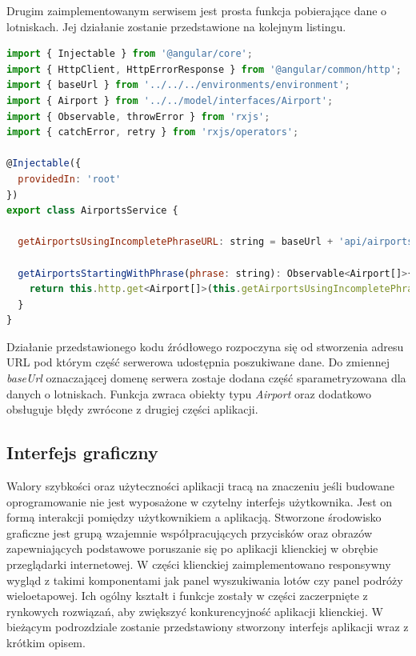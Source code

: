 \documentclass[12pt, twoside]{report}
\begin{document}
Drugim zaimplementowanym serwisem jest prosta funkcja pobierające dane o lotniskach. Jej działanie zostanie przedstawione na kolejnym listingu.
\begin{lstlisting}[language=JavaScript, caption= Kod źródłowy funkcji pobierającej wyniki z serwera]
import { Injectable } from '@angular/core';
import { HttpClient, HttpErrorResponse } from '@angular/common/http';
import { baseUrl } from '../../../environments/environment';
import { Airport } from '../../model/interfaces/Airport';
import { Observable, throwError } from 'rxjs';
import { catchError, retry } from 'rxjs/operators';

@Injectable({
  providedIn: 'root'
})
export class AirportsService {

  getAirportsUsingIncompletePhraseURL: string = baseUrl + 'api/airports/getAirportsStartingWith/';

  getAirportsStartingWithPhrase(phrase: string): Observable<Airport[]>{
    return this.http.get<Airport[]>(this.getAirportsUsingIncompletePhraseURL + phrase).pipe(catchError(this.handleError)); 
  }  
}
\end{lstlisting}
Działanie przedstawionego kodu źródłowego rozpoczyna się od stworzenia adresu URL pod którym część serwerowa udostępnia poszukiwane dane. Do zmiennej \textit{baseUrl} oznaczającej domenę serwera zostaje dodana część sparametryzowana dla danych o lotniskach. Funkcja zwraca obiekty typu \textit{Airport} oraz dodatkowo obsługuje błędy zwrócone z drugiej części aplikacji.
\subsection{Interfejs graficzny}
Walory szybkości oraz użyteczności aplikacji tracą na znaczeniu jeśli budowane oprogramowanie nie jest wyposażone w czytelny interfejs użytkownika. Jest on formą interakcji pomiędzy użytkownikiem a aplikacją. Stworzone środowisko graficzne jest grupą wzajemnie współpracujących przycisków oraz obrazów zapewniających podstawowe poruszanie się po aplikacji klienckiej w obrębie przeglądarki internetowej. 
W części klienckiej zaimplementowano responsywny wygląd z takimi komponentami jak panel wyszukiwania lotów czy panel podróży wieloetapowej. Ich ogólny kształt i funkcje zostały w części zaczerpnięte z rynkowych rozwiązań, aby zwiększyć konkurencyjność aplikacji klienckiej. 
\newpage
W bieżącym podrozdziale zostanie przedstawiony stworzony interfejs aplikacji wraz z krótkim opisem.
\end{document}
